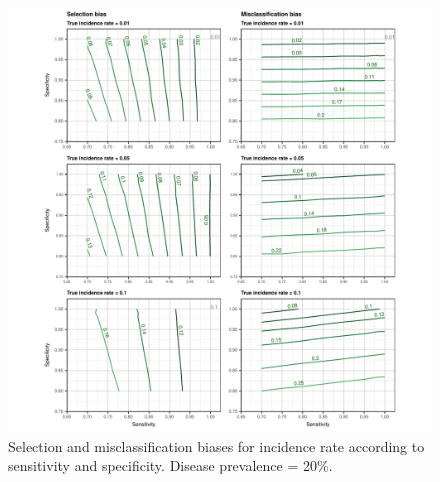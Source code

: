 \documentclass[utf8]{frontiers_suppmat} %
\begin{document}
\begin{figure}[htbp]
  \begin{center}
    \includegraphics[scale=.95]{master-incidence20_contourX-1}
    \end{center}
  \caption{Selection and misclassification biases for incidence rate according
    to sensitivity and specificity. Disease prevalence = 20\%.}
  \label{fig:incidence_contourX20}
\end{figure}
\end{document}
